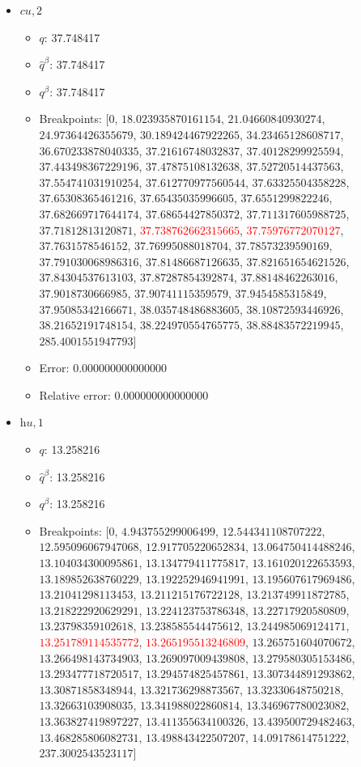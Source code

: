 \documentclass{article}%
\begin{document}
\begin{itemize}
\begin{itemize}
		\item Error: 0.000000000000000%
		\item Relative error: 0.000000000000000%
	\end{itemize}%
	\item $\textit{cu},2$%
	\begin{itemize}%
		\item $q$: 37.748417%
		\item $\hat{q}^\beta$: 37.748417%
		\item $q^\beta$: 37.748417%
		\item Breakpoints: $[$$0$, $18.023935870161154$, $21.04660840930274$, $24.97364426355679$, $30.189424467922265$, $34.23465128608717$, $36.670233878040335$, $37.21616748032837$, $37.40128299925594$, $37.443498367229196$, $37.47875108132638$, $37.52720514437563$, $37.554741031910254$, $37.612770977560544$, $37.63325504358228$, $37.65308365461216$, $37.65435035996605$, $37.6551299822246$, $37.682669717644174$, $37.68654427850372$, $37.711317605988725$, $37.71812813120871$, \textcolor{red}{$37.738762662315665$}, \textcolor{red}{$37.75976772070127$}, $37.7631578546152$, $37.76995088018704$, $37.78573239590169$, $37.791030068986316$, $37.81486687126635$, $37.821651654621526$, $37.84304537613103$, $37.87287854392874$, $37.88148462263016$, $37.9018730666985$, $37.90741115359579$, $37.9454585315849$, $37.95085342166671$, $38.035748486883605$, $38.10872593446926$, $38.21652191748154$, $38.224970554765775$, $38.88483572219945$, $285.4001551947793$$]$%
		\item Error: 0.000000000000000%
		\item Relative error: 0.000000000000000%
	\end{itemize}%
	\item $\textit{hu},1$%
	\begin{itemize}%
		\item $q$: 13.258216%
		\item $\hat{q}^\beta$: 13.258216%
		\item $q^\beta$: 13.258216%
		\item Breakpoints: $[$$0$, $4.943755299006499$, $12.544341108707222$, $12.595096067947068$, $12.917705220652834$, $13.064750414488246$, $13.104034300095861$, $13.134779411775817$, $13.161020122653593$, $13.189852638760229$, $13.192252946941991$, $13.195607617969486$, $13.21041298113453$, $13.211215176722128$, $13.213749911872785$, $13.218222920629291$, $13.224123753786348$, $13.22717920580809$, $13.23798359102618$, $13.238585544475612$, $13.244985069124171$, \textcolor{red}{$13.251789114535772$}, \textcolor{red}{$13.265195513246809$}, $13.265751604070672$, $13.266498143734903$, $13.269097009439808$, $13.279580305153486$, $13.293477718720517$, $13.294574825457861$, $13.307344891293862$, $13.30871858348944$, $13.321736298873567$, $13.32330648750218$, $13.32663103908035$, $13.341988022860814$, $13.346967780023082$, $13.363827419897227$, $13.411355634100326$, $13.439500729482463$, $13.468285806082731$, $13.498843422507207$, $14.09178614751222$, $237.3002543523117$$]$%

\end{itemize}
\end{itemize}
\end{document}
